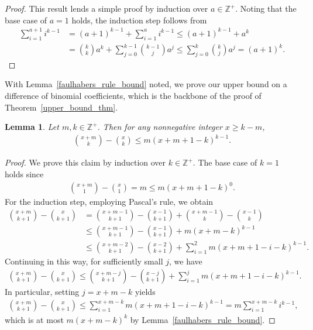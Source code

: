 \documentclass[11pt]{amsart}
\newtheorem{lemma}[theorem]{Lemma}
\newcommand{\ZZ}{\mathbb{Z}}
\begin{document}
\begin{proof}
    This result lends a simple proof by induction over $a\in\ZZ^+$. Noting that the base case of $a=1$ holds, the induction step follows from
    \begin{align*}
        \sum_{i=1}^{a+1}i^{k-1}&=(a+1)^{k-1}+\sum_{i=1}^{a}i^{k-1}\leq (a+1)^{k-1}+a^k\\
        &={k\choose k}a^k+\sum_{j=0}^{k-1}{k-1\choose j}a^j\leq \sum_{j=0}^{k}{k\choose j}a^j=(a+1)^k.
    \end{align*}
\end{proof}

With Lemma~\ref{faulhabers_rule_bound} noted, we prove our upper bound on a difference of binomial coefficients, which is the backbone of the proof of Theorem~\ref{upper_bound_thm}.

\begin{lemma}\label{difference_bound}
    Let $m,k\in\ZZ^+$. Then for any nonnegative integer $x\geq k-m$,
    \begin{align*}
        {x+m\choose k}-{x\choose k}\leq m(x+m+1-k)^{k-1}.
    \end{align*}
\end{lemma}

\begin{proof}
    We prove this claim by induction over $k\in\ZZ^+$. The base case of $k=1$ holds since
    \begin{align*}
        {x+m\choose 1}-{x\choose 1}=m\leq m(x+m+1-k)^0.
    \end{align*}
    For the induction step, employing Pascal's rule, we obtain
    \begin{align*}
        {x+m\choose k+1}-{x\choose k+1}&={x+m-1\choose k+1}-{x-1\choose k+1}+{x+m-1\choose k}-{x-1\choose k}\\
        &\leq {x+m-1\choose k+1}-{x-1\choose k+1}+m(x+m-k)^{k-1}\\
        &\leq {x+m-2\choose k+1}-{x-2\choose k+1}+\sum_{i=1}^{2}m(x+m+1-i-k)^{k-1}.
    \end{align*}
    Continuing in this way, for sufficiently small $j$, we have
    \begin{align*}
        {x+m\choose k+1}-{x\choose k+1}\leq {x+m-j\choose k+1}-{x-j\choose k+1}+\sum_{i=1}^{j}m(x+m+1-i-k)^{k-1}.
    \end{align*}
    In particular, setting $j=x+m-k$ yields   
    \begin{align*}    
        {x+m\choose k+1}-{x\choose k+1}\leq\sum_{i=1}^{x+m-k}m(x+m+1-i-k)^{k-1}=m\sum_{i=1}^{x+m-k}i^{k-1},
    \end{align*}
    which is at most $m(x+m-k)^{k}$ by Lemma~\ref{faulhabers_rule_bound}.
\end{proof}
\end{document}
